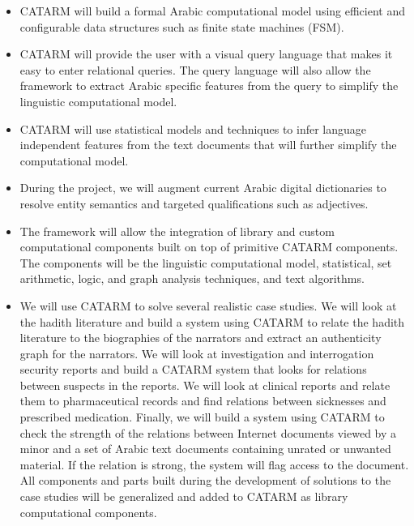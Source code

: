 \documentclass[12pt]{article}
\begin{document}
\begin{itemize}\itemsep0pt
\item CATARM will build a formal Arabic computational model
using efficient and configurable data structures such as 
finite state machines (FSM). 
\item CATARM will provide the user with a visual query 
language that makes it easy to enter relational queries. 
The query language will also allow the framework to extract Arabic
specific features from the query to simplify the linguistic 
computational model. 
\item CATARM will use statistical models and techniques
to infer language independent features from the text documents
that will further simplify the computational model. 
\item During the project, we will augment current Arabic digital 
dictionaries to resolve entity semantics and targeted 
qualifications such as adjectives.
\item The framework will allow the integration of library and 
custom computational components built on top of primitive
CATARM components. 
The components will be the linguistic computational model,
statistical, set arithmetic, logic,
and graph analysis techniques, and  text algorithms.
\item We will use CATARM to solve several realistic case studies.
We will look at the hadith literature and build a system using
CATARM to relate the hadith literature to the biographies of the
narrators and extract an authenticity graph for the narrators.
We will look at investigation and interrogation security reports
and build a CATARM system that looks for relations between suspects
in the reports. 
We will look at clinical reports and relate them to pharmaceutical 
records and find relations between sicknesses and prescribed medication. 
Finally, we will build a system using CATARM to check the strength
of the relations between Internet documents viewed by a minor and
a set of Arabic text documents containing unrated or unwanted 
material. If the relation is strong, the system will flag access to
the document. 
All components and parts built during the development of solutions
to the case studies will be generalized and added to CATARM as 
library computational components. 
\end{itemize}
\end{document}

